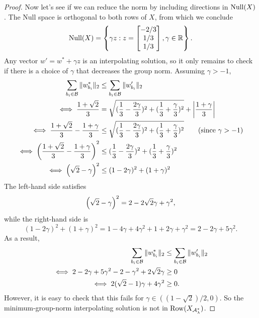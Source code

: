 \begin{proof}
    Now let's see if we can reduce the norm by including directions in \( \text{Null}(X) \).
    The Null space is orthogonal to both rows of \( X \), from which we conclude
    \[
        \text{Null}(X) =
        \left\{
            \gamma z : z =
            \begin{bmatrix}
                -2/3 \\
                1/3  \\
                1/3
            \end{bmatrix},
            \gamma \in \mathbb{R}
        \right\}.
    \]
    Any vector \( w' = w^* + \gamma z \) is an interpolating solution,
    so it only remains to check if there is a choice of \( \gamma \)
    that decreases the group norm.
    Assuming \( \gamma > -1 \),
    \begin{align*}
        \sum_{{b_i} \in \mathcal{B}} \|w_{b_i}^*\|_2
         & \leq \sum_{{b_i} \in \mathcal{B}} \|w_{b_i}'\|_2                                                                             \\
        \iff \frac{1 + \sqrt{2}}{3}
         & = \sqrt{(\frac{1}{3} - \frac{2 \gamma}{3})^2 + (\frac{1}{3} + \frac{\gamma}{3})^2}
        + \left\vert \frac{1 + \gamma}{3}\right\vert                                                                                           \\
        \iff \frac{1 + \sqrt{2}}{3} - \frac{1 + \gamma}{3}
         & \leq \sqrt{(\frac{1}{3} - \frac{2 \gamma}{3})^2 + (\frac{1}{3} + \frac{\gamma}{3})^2} \tag{since \( \gamma > -1 \)} \\
        \iff \left(\frac{1 + \sqrt{2}}{3} - \frac{1 + \gamma}{3}\right)^2
         & \leq (\frac{1}{3} - \frac{2 \gamma}{3})^2 + (\frac{1}{3} + \frac{\gamma}{3})^2                                      \\
        \iff \left(\sqrt{2} - \gamma\right)^2
         & \leq (1 - 2 \gamma)^2 + (1 + \gamma)^2
    \end{align*}
    The left-hand side satisfies
    \[
        \left(\sqrt{2} - \gamma\right)^2 = 2 - 2\sqrt{2}\gamma + \gamma^2,
    \]
    while the right-hand side is
    \[
        (1 - 2 \gamma)^2 + (1 + \gamma)^2 = 1 - 4 \gamma + 4 \gamma^2 + 1 + 2 \gamma + \gamma^2
        =  2 - 2 \gamma + 5 \gamma^2.
    \]
    As a result,
    \begin{align*}
        \sum_{{b_i} \in \mathcal{B}} \|w_{b_i}^*\|_2
                                                                          & \leq \sum_{{b_i} \in \mathcal{B}} \|w_{b_i}'\|_2 \\
        \iff 2 - 2 \gamma + 5 \gamma^2 - 2 - \gamma^2 + 2 \sqrt{2} \gamma & \geq 0                                  \\
        \iff 2 (\sqrt{2} - 1)\gamma + 4 \gamma^2                          & \geq 0.
    \end{align*}
    However, it is easy to check that this fails for \( \gamma \in ((1 - \sqrt{2})/2, 0) \).
    So the minimum-group-norm interpolating solution is not in \( \text{Row}(X_{\mathcal{A}_{\lambda}^{*}}) \).


\end{proof}
